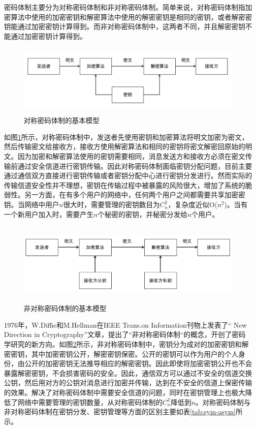 密码体制主要分为对称密码体制和非对称密码体制。简单来说，对称密码体制指加密算法中使用的加密密钥和解密算法中使用的解密密钥是相同的密钥，或者解密密钥能通过加密密钥计算得到。而非对称密码体制中，这两者不同，并且解密密钥不能通过加密密钥计算得到。

\begin{figure}[H]
\centering	
\includegraphics [width=400pt,height=100pt]{figures/sym-crypto.png}
\caption{对称密码体制的基本模型}
\label{fig:sym-crypto}
\end{figure}

如图\ref{fig:sym-crypto}所示，对称密码体制中，发送者先使用密钥和加密算法将明文加密为密文，然后传输密文给接收方，接收方使用解密算法和相同的密钥将密文解密回原始的明文。因为加密和解密算法使用的密钥需要相同，消息发送方和接收方必须在密文传输前通过安全信道进行密钥传输。因此对称密码体制面临密钥分配问题，目前主要通过通信双方直接进行密钥传输或者密钥分配中心进行密钥分发进行。然而实际的传输信道安全性并不理想，密钥在传输过程中被暴露的风险很大，增加了系统的脆弱性。另一方面，在有多个用户的网络中，任何两个用户之间都需要共享加密密钥。当网络中用户$n$很大时，需要管理的密钥数目为$C_n^2$，复杂度近似O($n^2$)。当有一个新用户加入时，需要产生$n$个秘密的密钥，并秘密分发给$n$个用户。

\begin{figure}[H]
\centering	
\includegraphics [width=400pt,height=115pt]{figures/asym-crypto.png}
\caption{非对称密码体制的基本模型}
\label{fig:asym-crypto}
\end{figure}

1976年，W.Diffie和M.Hellman在IEEE Trans.on Information刊物上发表了“ New Direction in Cryptography”文章，提出了“非对称密码体制“的概念，开创了密码学研究的新方向。如图\ref{fig:asym-crypto}所示，非对称密码体制中，密钥分为成对的加密密钥和解密密钥，其中加密密钥公开，解密密钥保密。公开的密钥可以作为用户的个人身份，由公开的加密密钥无法推导相应的解密密钥。因此即使将加密密钥公开也不会暴露解密密钥，不会损害密码的安全。因此，通信双方可以通过不安全的信道交换公钥，然后用对方的公钥对消息进行加密并传输，达到在不安全的信道上保密传输的效果。解决了对称密码体制中需要安全信道的问题，同时在密钥管理上也极大降低了网络中需要管理的密钥数量，从对称密码体制的$C_n^2$降低到$n$。对称密码体制与非对称密码体制在密钥分发、密钥管理等方面的区别主要如表\ref{tab:sym-asym}所示。


